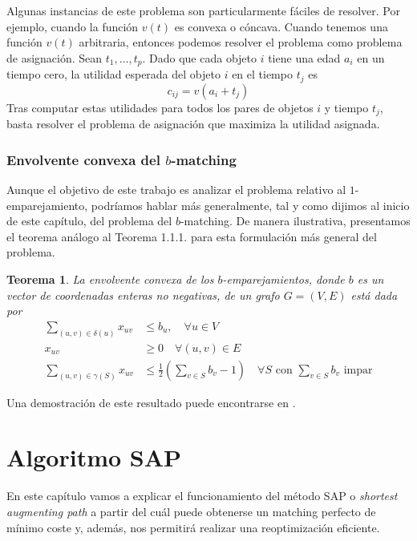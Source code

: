 \documentclass[twoside,a4paper,openright,12pt,tikz]{book}
\newtheorem{thm}{Teorema}[section]
\begin{document}
Algunas instancias de este problema son particularmente fáciles de resolver. Por ejemplo, cuando la función $v(t)$ es convexa o cóncava. Cuando tenemos una función $v(t)$ arbitraria, entonces podemos resolver el problema como problema de asignación. Sean $t_1,\dotsc, t_p$. Dado que cada objeto $i$ tiene una edad $a_i$ en un tiempo cero, la utilidad esperada del objeto $i$ en el tiempo $t_j$ es
$$
c_{ij} = v(a_i+t_j)
$$
Tras computar estas utilidades para todos los pares de objetos $i$ y tiempo $t_j$, basta resolver el problema de asignación que maximiza la utilidad asignada.
\subsection{Envolvente convexa del $b$-matching}
Aunque el objetivo de este trabajo es analizar el problema relativo al $1$-emparejamiento, podríamos hablar más generalmente, tal y como dijimos al inicio de este capítulo, del problema del $b$-matching. De manera ilustrativa, presentamos el teorema análogo al Teorema 1.1.1. para esta formulación más general del problema. 
\begin{thm}
La envolvente convexa de los $b$-emparejamientos, donde $b$ es un vector de coordenadas enteras no negativas, de un grafo $G=(V,E)$ está dada por
\begin{align*}
\sum_{(u,v)\in\delta(u)} x_{uv} &\leq b_u, \quad \forall u\in V\\
x_{uv} &\geq 0 \quad \forall(u,v)\in E\\
\sum_{(u,v)\in \gamma(S)} x_{uv}& \leq \frac{1}{2}\left(\sum_{v\in S} b_v -1\right) \quad \forall S \text{ con $\sum_{v\in S} b_v$ impar}
\end{align*}
\end{thm}
Una demostración de este resultado puede encontrarse en \cite{inte}.
\chapter{Algoritmo SAP}
En este capítulo vamos a explicar el funcionamiento del método SAP o \textit{shortest augmenting path} a partir del cuál puede obtenerse un matching perfecto de mínimo coste y, además, nos permitirá realizar una reoptimización eficiente.
\end{document}
